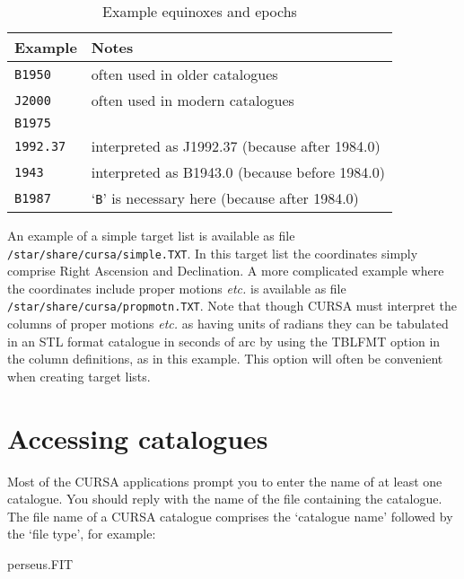\documentclass[twoside,11pt]{starlink}
\begin{document}
\begin{table}[htbp]

\begin{center}
\begin{tabular}{ll}
Example        & Notes  \\ \hline
\texttt{B1950}    & often used in older catalogues \\
\texttt{J2000}    & often used in modern catalogues \\
\texttt{B1975}    & \\
\texttt{1992.37}  & interpreted as J1992.37 (because after 1984.0)  \\
\texttt{1943}     & interpreted as B1943.0 (because before 1984.0)  \\
\texttt{B1987}    & `\texttt{B}' is necessary here (because after 1984.0)  \\
\end{tabular}

\caption{Example equinoxes and epochs \label{EQEP} }
\end{center}

\end{table}

An example of a simple target list is available as file \texttt{/star/share/cursa/simple.TXT}.  In this target list the coordinates
simply comprise Right Ascension and Declination.  A more complicated
example where the coordinates include proper motions \emph{etc.} is
available as file \texttt{/star/share/cursa/propmotn.TXT}.  Note that
though CURSA must interpret the columns of proper motions \emph{etc.} as
having units of radians they can be tabulated in an STL format catalogue
in seconds of arc by using the TBLFMT option in the column definitions,
as in this example.  This option will often be convenient when creating
target lists.


\section{Accessing catalogues}

Most of the CURSA applications prompt you to enter the name of at least
one catalogue.  You should reply with the name of the file containing the
catalogue.  The file name of a CURSA catalogue comprises the `catalogue
name' followed by the `file type', for example:

\begin{terminalv}
perseus.FIT
\end{terminalv}
\end{document}
